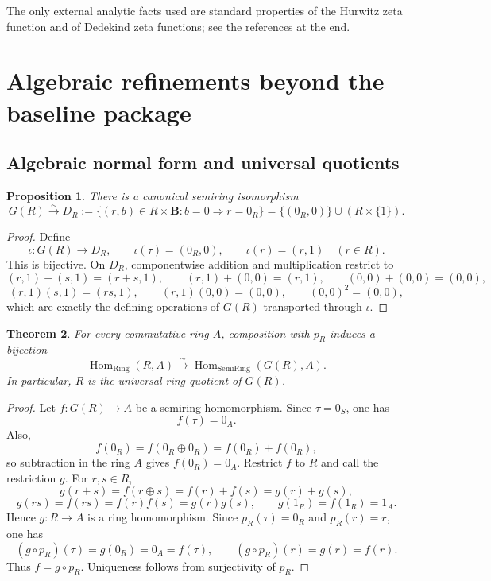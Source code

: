 \documentclass[11pt]{amsart}
\numberwithin{equation}{section}
\newtheorem{theorem}{Theorem}[section]
\newtheorem{proposition}[theorem]{Proposition}
\theoremstyle{definition}
\newcommand{\B}{\mathbf B}
\newcommand{\Hom}{\operatorname{Hom}}
\begin{document}
The only external analytic facts used are standard properties of the Hurwitz zeta function and of Dedekind zeta functions; see the references at the end.

\section{Algebraic refinements beyond the baseline package}

\subsection{Algebraic normal form and universal quotients}

\begin{proposition}\label{prop:normal-form}
There is a canonical semiring isomorphism
\[
G(R)\xrightarrow{\sim}D_R:=\{(r,b)\in R\times\B: b=0\Rightarrow r=0_R\}
=\{(0_R,0)\}\cup (R\times\{1\}).
\]
\end{proposition}

\begin{proof}
Define
\[
\iota:G(R)\to D_R,
\qquad
\iota(\tau)=(0_R,0),
\qquad
\iota(r)=(r,1)
\quad(r\in R).
\]
This is bijective. On $D_R$, componentwise addition and multiplication restrict to
\[
(r,1)+(s,1)=(r+s,1),
\qquad
(r,1)+(0,0)=(r,1),
\qquad
(0,0)+(0,0)=(0,0),
\]
\[
(r,1)(s,1)=(rs,1),
\qquad
(r,1)(0,0)=(0,0),
\qquad
(0,0)^2=(0,0),
\]
which are exactly the defining operations of $G(R)$ transported through $\iota$. 
\end{proof}

\begin{theorem}\label{thm:ring-quotient}
For every commutative ring $A$, composition with $p_R$ induces a bijection
\[
\Hom_{\mathrm{Ring}}(R,A)
\xrightarrow{\sim}
\Hom_{\mathrm{SemiRing}}(G(R),A).
\]
In particular, $R$ is the universal ring quotient of $G(R)$.
\end{theorem}

\begin{proof}
Let $f:G(R)\to A$ be a semiring homomorphism. Since $\tau=0_S$, one has
\[
f(\tau)=0_A.
\]
Also,
\[
f(0_R)=f(0_R\oplus 0_R)=f(0_R)+f(0_R),
\]
so subtraction in the ring $A$ gives $f(0_R)=0_A$. Restrict $f$ to $R$ and call the restriction $g$. For $r,s\in R$,
\[
g(r+s)=f(r\oplus s)=f(r)+f(s)=g(r)+g(s),
\]
\[
g(rs)=f(rs)=f(r)f(s)=g(r)g(s),
\qquad
 g(1_R)=f(1_R)=1_A.
\]
Hence $g:R\to A$ is a ring homomorphism. Since $p_R(\tau)=0_R$ and $p_R(r)=r$, one has
\[
(g\circ p_R)(\tau)=g(0_R)=0_A=f(\tau),
\qquad
(g\circ p_R)(r)=g(r)=f(r).
\]
Thus $f=g\circ p_R$. Uniqueness follows from surjectivity of $p_R$. 
\end{proof}
\end{document}
